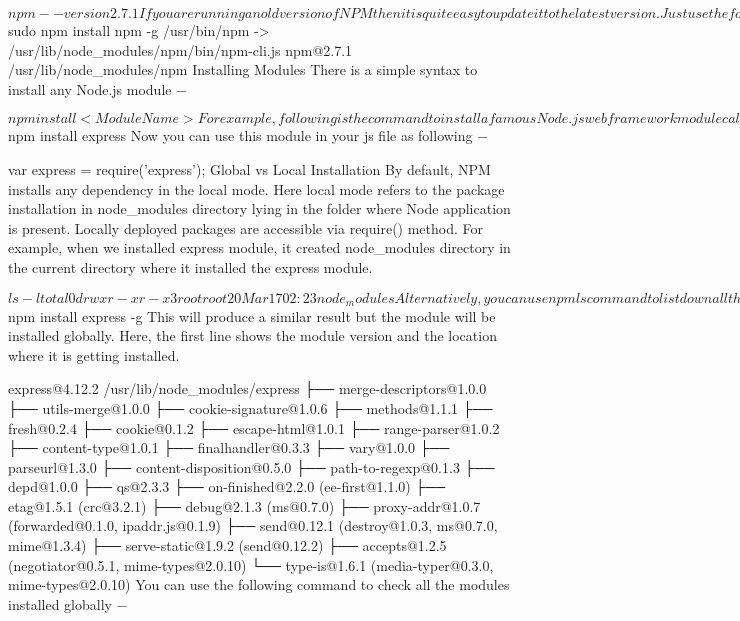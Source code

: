 $ npm --version
2.7.1
If you are running an old version of NPM then it is quite easy to update it to the latest version. Just use the following command from root −

$ sudo npm install npm -g
/usr/bin/npm -> /usr/lib/node_modules/npm/bin/npm-cli.js
npm@2.7.1 /usr/lib/node_modules/npm
Installing Modules
There is a simple syntax to install any Node.js module −

$ npm install <Module Name>
For example, following is the command to install a famous Node.js web framework module called express −

$ npm install express
Now you can use this module in your js file as following −

var express = require('express');
Global vs Local Installation
By default, NPM installs any dependency in the local mode. Here local mode refers to the package installation in node_modules directory lying in the folder where Node application is present. Locally deployed packages are accessible via require() method. For example, when we installed express module, it created node_modules directory in the current directory where it installed the express module.

$ ls -l
total 0
drwxr-xr-x 3 root root 20 Mar 17 02:23 node_modules
Alternatively, you can use npm ls command to list down all the locally installed modules.

Globally installed packages/dependencies are stored in system directory. Such dependencies can be used in CLI (Command Line Interface) function of any node.js but cannot be imported using require() in Node application directly. Now let's try installing the express module using global installation.

$ npm install express -g
This will produce a similar result but the module will be installed globally. Here, the first line shows the module version and the location where it is getting installed.

express@4.12.2 /usr/lib/node_modules/express
├── merge-descriptors@1.0.0
├── utils-merge@1.0.0
├── cookie-signature@1.0.6
├── methods@1.1.1
├── fresh@0.2.4
├── cookie@0.1.2
├── escape-html@1.0.1
├── range-parser@1.0.2
├── content-type@1.0.1
├── finalhandler@0.3.3
├── vary@1.0.0
├── parseurl@1.3.0
├── content-disposition@0.5.0
├── path-to-regexp@0.1.3
├── depd@1.0.0
├── qs@2.3.3
├── on-finished@2.2.0 (ee-first@1.1.0)
├── etag@1.5.1 (crc@3.2.1)
├── debug@2.1.3 (ms@0.7.0)
├── proxy-addr@1.0.7 (forwarded@0.1.0, ipaddr.js@0.1.9)
├── send@0.12.1 (destroy@1.0.3, ms@0.7.0, mime@1.3.4)
├── serve-static@1.9.2 (send@0.12.2)
├── accepts@1.2.5 (negotiator@0.5.1, mime-types@2.0.10)
└── type-is@1.6.1 (media-typer@0.3.0, mime-types@2.0.10)
You can use the following command to check all the modules installed globally −

